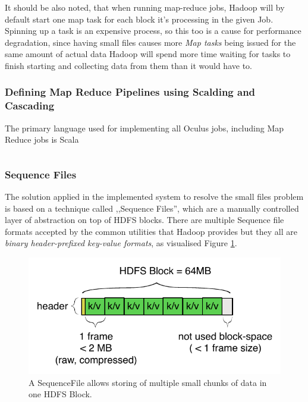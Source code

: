 It should be also noted, that when running map-reduce jobs, Hadoop will by default start one map task for each block it's processing in the given Job. Spinning up a task is an expensive process, so this too is a cause for performance degradation, since having small files causes more \textit{Map tasks} being issued for the same amount of actual data Hadoop will spend more time waiting for tasks to finish starting and collecting data from them than it would have to.

\subsubsection{Defining Map Reduce Pipelines using Scalding and Cascading}
The primary language used for implementing all Oculus jobs, including Map Reduce jobs is Scala \cite{scala}

\begin{lstlisting}[caption={Simplest Scalding job used in Oculus -- each frame perceptual hashing}, label={lst:simplest-scalding-job}]

\end{lstlisting}



\subsubsection{Sequence Files}
\label{sequence-file}
The solution applied in the implemented system to resolve the small files problem is based on a technique called ,,Sequence Files'', which are a manually controlled layer of abstraction on top of HDFS blocks. There are multiple Sequence file formats accepted by the common utilities that Hadoop provides \cite{hadoop-seq-files} but they all are \textit{binary header-prefixed key-value formats}, as visualised Figure \ref{fig:sequence-file}.


\begin{figure}[ch!]
  \centering
  \includegraphics[scale=0.9]{diagrams/sequence-file.pdf}
  \caption{A SequenceFile allows storing of multiple small chunks of data in one HDFS Block.}
  \label{fig:sequence-file}
\end{figure}

